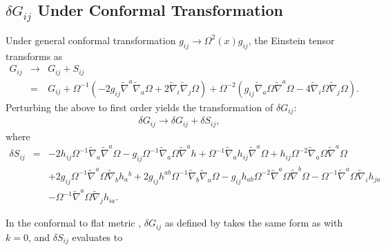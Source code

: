 \documentclass[10pt,letterpaper]{article}
\numberwithin{equation}{section}
\begin{document}
\begin{appendices}
\section{$\delta G_{ij}$ Under Conformal Transformation}
Under general conformal transformation $g_{ij}\to \Omega^2(x)g_{ij}$, the  Einstein tensor transforms as
\begin{eqnarray}
G_{ij} &\to& G_{ij} + S_{ij}
\nonumber\\
&=& G_{ij} +
\Omega^{-1}\left( -2g_{ij}\tilde\nabla^a \tilde\nabla_a \Omega + 2\tilde\nabla_i\tilde \nabla_j \Omega\right) +
\Omega^{-2}\left( g_{ij} \tilde\nabla_a \Omega \tilde\nabla^a \Omega - 4\tilde \nabla_i \Omega \tilde\nabla_j \Omega\right).
\end{eqnarray}
Perturbing the above to first order yields the transformation of $\delta G_{ij}$:
\begin{eqnarray}
\delta G_{ij} \to \delta G_{ij} + \delta S_{ij},
\label{dGsum}
\end{eqnarray}
where
\begin{eqnarray}
\delta S_{ij}&=&-2 h_{ij} \Omega^{-1} \tilde{\nabla}_{a}\tilde{\nabla}^{a}\Omega
 -  g_{ij} \Omega^{-1} \tilde{\nabla}_{a}\Omega \tilde{\nabla}^{a}h
 + \Omega^{-1} \tilde{\nabla}_{a}h_{ij} \tilde{\nabla}^{a}\Omega
 + h_{ij} \Omega^{-2} \tilde{\nabla}_{a}\Omega \tilde{\nabla}^{a}\Omega\nonumber\\
&& + 2 g_{ij} \Omega^{-1} \tilde{\nabla}^{a}\Omega \tilde{\nabla}_{b}h_{a}{}^{b}
 + 2 g_{ij} h^{ab} \Omega^{-1} \tilde{\nabla}_{b}\tilde{\nabla}_{a}\Omega
 -  g_{ij} h_{ab} \Omega^{-2} \tilde{\nabla}^{a}\Omega \tilde{\nabla}^{b}\Omega
 -  \Omega^{-1} \tilde{\nabla}^{a}\Omega \tilde{\nabla}_{i}h_{ja}\nonumber\\
&&-  \Omega^{-1} \tilde{\nabla}^{a}\Omega \tilde{\nabla}_{j}h_{ia}.
\end{eqnarray}

In the conformal to flat metric , $\delta G_{ij}$ as defined by  takes the same form as with $k=0$,  and $\delta S_{ij}$ evaluates to


\end{appendices}
\end{document}
